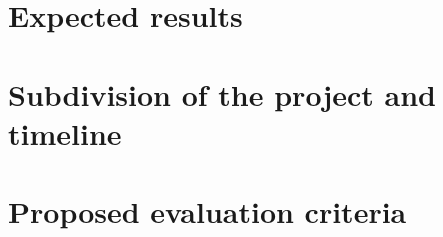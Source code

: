 \documentclass[12pt, a4paper]{article}
\begin{document}
\section{Expected results}\label{sec:expected-results}

\section{Subdivision of the project and timeline}\label{sec:subdivision-of-the-project-and-timeline}

\section{Proposed evaluation criteria}\label{sec:proposed-evaluation-criteria}



\end{document}
